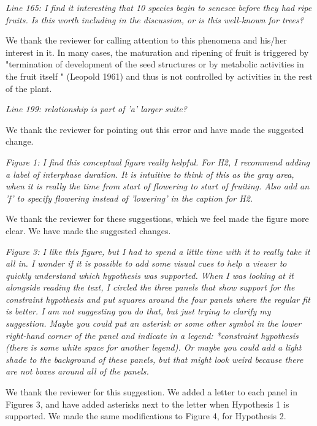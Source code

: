 \documentclass[10.95pt,a4paper]{letter}
\begin{document}
\par \emph{Line 165: I find it interesting that 10 species begin to senesce before they had ripe fruits. Is this worth including in the discussion, or is this well-known for trees?} 
\par We thank the reviewer for calling attention to this phenomena and his/her interest in it. In many cases, the maturation and ripening of fruit is triggered by "termination of development of the seed structures or by metabolic activities in the fruit itself " (Leopold 1961) and thus is not controlled by activities in the rest of the plant. 

\par \emph{Line 199: relationship is part of 'a' larger suite?}
\par We thank the reviewer for pointing out this error and have made the suggested change. 


\par \emph{Figure 1: I find this conceptual figure really helpful.  For H2, I recommend adding a label of interphase duration.  It is intuitive to think of this as the gray area, when it is really the time from start of flowering to start of fruiting.  Also add an 'f' to specify flowering instead of 'lowering' in the caption for H2.} 
\par We thank the reviewer for these suggestions, which we feel made the figure more clear. We have made the suggested changes. 


\par \emph{Figure 3:  I like this figure, but I had to spend a little time with it to really take it all in.  I wonder if it is possible to add some visual cues to help a viewer to quickly understand which hypothesis was supported.  When I was looking at it alongside reading the text, I circled the three panels that show support for the constraint hypothesis and put squares around the four panels where the regular fit is better.  I am not suggesting you do that, but just trying to clarify my suggestion.  Maybe you could put an asterisk or some other symbol in the lower right-hand corner of the panel and indicate in a legend: *constraint hypothesis (there is some white space for another legend). Or maybe you could add a light shade to the background of these panels, but that might look weird because there are not boxes around all of the panels.} 
\par We thank the reviewer for this suggestion. We added a letter to each panel in Figures 3, and have added asterisks next to the letter when Hypothesis 1 is supported. We made the same modifications to Figure 4, for Hypothesis 2. \\
\end{document}
